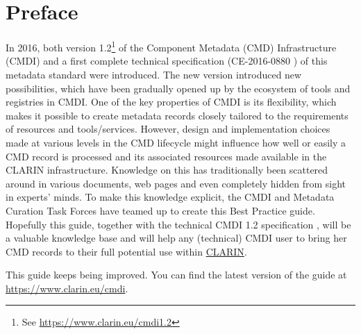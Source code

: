 \section{Preface}
In 2016, both version 1.2\footnote{See \url{https://www.clarin.eu/cmdi1.2}} of
the  Component Metadata (CMD) Infrastructure (CMDI) and a first complete technical specification (CE-2016-0880 \cite{ce20130095})  of this metadata standard were introduced. The new version introduced new possibilities, which have been gradually opened up by the ecosystem of tools and registries in CMDI. One of the key properties of CMDI is its flexibility, which makes it possible to create metadata records closely tailored to the requirements of resources and tools/services. However, design and implementation choices made at various levels in the CMD lifecycle might influence how well or easily a CMD record is processed and its associated resources made available in the CLARIN infrastructure. Knowledge on this has traditionally been scattered around in various documents, web pages and even completely hidden from sight in experts' minds. To make this
knowledge explicit, the CMDI and Metadata Curation Task Forces have teamed up to create this Best Practice guide. Hopefully this guide, together with the technical CMDI 1.2 specification \cite{ce20130095}, will be a valuable knowledge base and will help any (technical) CMDI user to bring her CMD records to their full potential use within \href{https://www.clarin.eu}{CLARIN}.

This guide keeps being improved. You can find the latest version of the guide at \url{https://www.clarin.eu/cmdi}.

